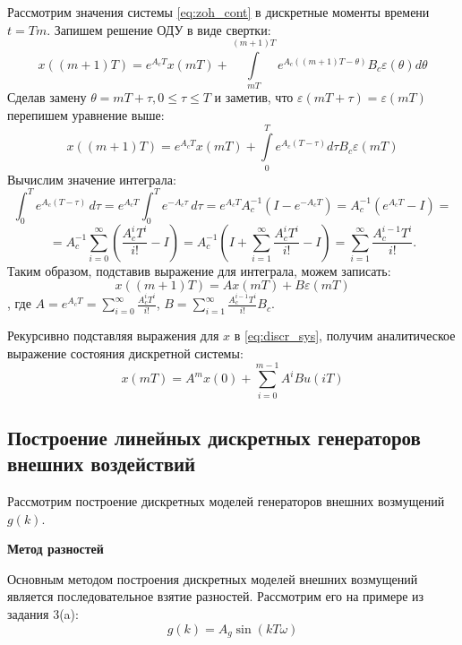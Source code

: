 \documentclass[a4paper, 14pt]{extarticle}
\theoremstyle{definition}
\theoremstyle{plain}
\theoremstyle{remark}
\begin{document}
Рассмотрим значения системы \ref{eq:zoh_cont} в дискретные моменты времени $t = Tm$. Запишем решение ОДУ в виде свертки:
\begin{equation*}
	x((m+1)T) = e^{A_cT}x(mT) + \int\limits_{mT}^{(m+1)T}e^{A_c((m+1)T-\theta)}B_c\varepsilon(\theta)d\theta
\end{equation*}
Сделав замену $\theta=mT + \tau, 0\le\tau\le T$ и заметив, что $\varepsilon(mT + \tau) = \varepsilon(mT)$ перепишем уравнение выше:
\begin{equation*}
	x((m+1)T) = e^{A_cT}x(mT) + \int\limits_{0}^{T}e^{A_c(T-\tau)}d\tau B_c\varepsilon(mT)
\end{equation*}
Вычислим значение интеграла:
\begin{equation*}
	\int_0^T e^{A_c (T - \tau)} \, d\tau = e^{A_c T} \int_0^T e^{-A_c \tau} \, d\tau = e^{A_c T} A_c^{-1} \left( I - e^{-A_c T} \right) = A_c^{-1} \left( e^{A_c T} - I \right)=
\end{equation*}
\begin{equation*}
	= A_c^{-1} \sum_{i=0}^{\infty} \left( \frac{A_c^i T^i}{i!} - I \right) = A_c^{-1} \left( I + \sum_{i=1}^{\infty} \frac{A_c^i T^i}{i!} - I \right) = \sum_{i=1}^{\infty} \frac{A_c^{i-1} T^i}{i!}.
\end{equation*}
Таким образом, подставив выражение для интеграла, можем записать:
\begin{equation}\label{eq:discr_sys}
	x((m+1)T) = Ax(mT) + B\varepsilon(mT)
\end{equation}
, где $A = e^{A_cT}=\sum\limits_{i=0}^{\infty}\frac{A_c^iT^i}{i!}$, $B = \sum\limits_{i=1}^{\infty}\frac{A_c^{i-1}T^i}{i!}B_c$.

Рекурсивно подставляя выражения для $x$ в \ref{eq:discr_sys}, получим аналитическое выражение состояния дискретной системы:
\begin{equation}
	x(mT)=A^mx(0) + \sum\limits_{i=0}^{m-1}A^iBu(iT)
\end{equation}

\subsection{Построение линейных дискретных генераторов внешних воздействий}
Рассмотрим построение дискретных моделей генераторов внешних возмущений $g(k)$.

\textbf{Метод разностей}

Основным методом построения дискретных моделей внешних возмущений является последовательное взятие разностей. Рассмотрим его на примере из задания 3(a):
\begin{equation}\label{eq:gen1}
	g(k) = A_g\sin(kT\omega)
\end{equation}
\end{document}
